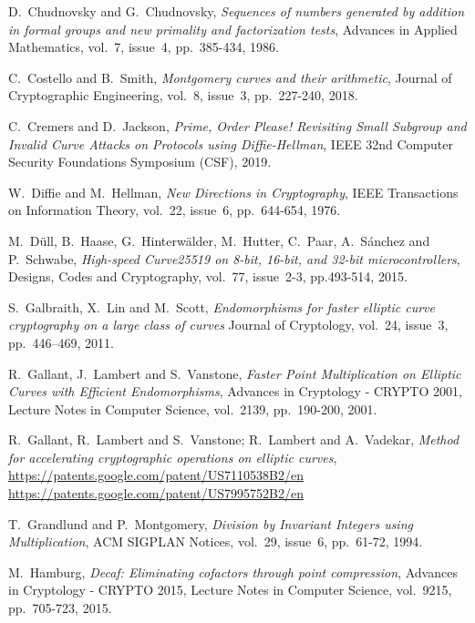 \documentclass{llncs}
\begin{document}
\begin{thebibliography}{20}
D.~Chudnovsky and G.~Chudnovsky,
\emph{Sequences of numbers generated by addition in formal groups and
new primality and factorization tests},
Advances in Applied Mathematics, vol.~7, issue~4, pp.~385-434, 1986.

C.~Costello and B.~Smith,
\emph{Montgomery curves and their arithmetic},
Journal of Cryptographic Engineering, vol.~8, issue~3, pp.~227-240, 2018.

C.~Cremers and D.~Jackson,
\emph{Prime, Order Please! Revisiting Small Subgroup and Invalid Curve
Attacks on Protocols using Diffie-Hellman},
IEEE 32nd Computer Security Foundations Symposium (CSF), 2019.

W.~Diffie and M.~Hellman,
\emph{New Directions in Cryptography},
IEEE Transactions on Information Theory, vol.~22, issue~6, pp.~644-654, 1976.

M.~Düll, B.~Haase, G.~Hinterwälder, M.~Hutter, C.~Paar, A.~Sánchez
and P.~Schwabe,
\emph{High-speed Curve25519 on 8-bit, 16-bit, and 32-bit microcontrollers},
Designs, Codes and Cryptography, vol.~77, issue~2-3, pp.493-514, 2015.

S.~Galbraith, X.~Lin and M.~Scott,
\emph{Endomorphisms for faster elliptic curve cryptography on a large
class of curves}
Journal of Cryptology, vol.~24, issue~3, pp.~446–469, 2011.

R.~Gallant, J.~Lambert and S.~Vanstone,
\emph{Faster Point Multiplication on Elliptic Curves with Efficient
Endomorphisms},
Advances in Cryptology - CRYPTO 2001, Lecture Notes in Computer Science,
vol.~2139, pp.~190-200, 2001.

R.~Gallant, R.~Lambert and S.~Vanstone; R.~Lambert and A.~Vadekar,
\emph{Method for accelerating cryptographic operations on elliptic curves},\\
\url{https://patents.google.com/patent/US7110538B2/en}\\
\url{https://patents.google.com/patent/US7995752B2/en}

T.~Grandlund and P.~Montgomery,
\emph{Division by Invariant Integers using Multiplication},
ACM SIGPLAN Notices, vol.~29, issue~6, pp.~61-72, 1994.

M.~Hamburg,
\emph{Decaf: Eliminating cofactors through point compression},
Advances in Cryptology - CRYPTO 2015, Lecture Notes in Computer Science,
vol.~9215, pp.~705-723, 2015.


\end{thebibliography}
\end{document}
